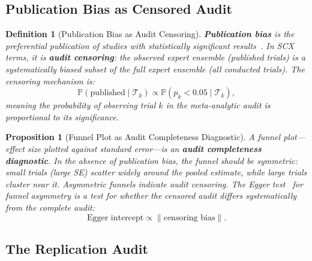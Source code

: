 \documentclass[12pt,a4paper]{article}
\newtheorem{proposition}[theorem]{Proposition}
\newtheorem{definition}[theorem]{Definition}
\theoremstyle{remark}
\newcommand{\Pbb}{\mathbb{P}}
\newcommand{\SCX}{\textsf{SCX}}
\begin{document}
\subsection{Publication Bias as Censored Audit}

\begin{definition}[Publication Bias as Audit Censoring]
\label{def:publication_bias}
\textbf{Publication bias} is the preferential publication of studies with
statistically significant results~\cite{rosenthal1979file}. In \SCX{} terms,
it is \textbf{audit censoring}: the observed expert ensemble (published
trials) is a systematically biased subset of the full expert ensemble (all
conducted trials). The censoring mechanism is:
\begin{equation}
  \Pbb(\text{published} \mid \mathcal{T}_k) \propto
  \Pbb(p_k < 0.05 \mid \mathcal{T}_k),
\end{equation}
meaning the probability of observing trial $k$ in the meta-analytic
audit is proportional to its significance.
\end{definition}

\begin{proposition}[Funnel Plot as Audit Completeness Diagnostic]
\label{prop:funnel}
A funnel plot---effect size plotted against standard error---is an
\textbf{audit completeness diagnostic}. In the absence of publication bias,
the funnel should be symmetric: small trials (large SE) scatter widely
around the pooled estimate, while large trials cluster near it. Asymmetric
funnels indicate audit censoring. The Egger test~\cite{egger1997bias} for
funnel asymmetry is a test for whether the censored audit differs
systematically from the complete audit:
\begin{equation}
  \text{Egger intercept} \propto \|\text{censoring bias}\|.
\end{equation}
\end{proposition}

\subsection{The Replication Audit}
\end{document}
